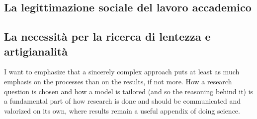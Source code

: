 \documentclass[a4paper, headings=standardclasses]{scrartcl}
\begin{document}
\subsection{La legittimazione sociale del lavoro accademico}

\subsection{La necessità per la ricerca di lentezza e artigianalità}
I want to emphasize that a sincerely complex approach puts at least as much emphasis on the processes than on the results, if not more. How a research question is chosen and how a model is tailored (and so the reasoning behind it) is a fundamental part of how research is done and should be communicated and valorized on its own, where results remain a useful appendix of doing science.


\printbibliography
\end{document}
